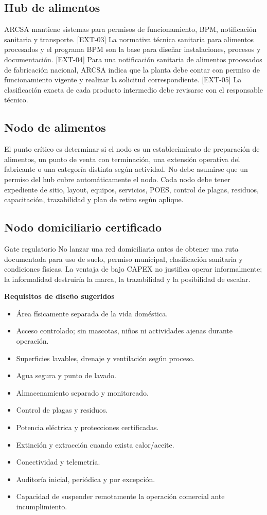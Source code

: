 \documentclass[11pt,a4paper]{article}
\newcommand{\etiqueta}[1]{\par\medskip\noindent\textbf{#1}\par\nopagebreak\smallskip}
\begin{document}
\subsection{Hub de alimentos}
ARCSA mantiene sistemas para permisos de funcionamiento, BPM, notificación sanitaria y transporte.
[EXT-03] La normativa técnica sanitaria para alimentos procesados y el programa BPM son la base para
diseñar instalaciones, procesos y documentación. [EXT-04] Para una notificación sanitaria de alimentos
procesados de fabricación nacional, ARCSA indica que la planta debe contar con permiso de funcionamiento
vigente y realizar la solicitud correspondiente. [EXT-05] La clasificación exacta de cada producto
intermedio debe revisarse con el responsable técnico.

\subsection{Nodo de alimentos}
El punto crítico es determinar si el nodo es un establecimiento de preparación de alimentos, un punto de
venta con terminación, una extensión operativa del fabricante o una categoría distinta según actividad.
No debe asumirse que un permiso del hub cubre automáticamente el nodo. Cada nodo debe tener expediente de
sitio, layout, equipos, servicios, POES, control de plagas, residuos, capacitación, trazabilidad y plan de
retiro según aplique.

\subsection{Nodo domiciliario certificado}
\begin{caja}{Gate regulatorio}
No lanzar una red domiciliaria antes de obtener una ruta documentada para uso de suelo, permiso
municipal, clasificación sanitaria y condiciones físicas. La ventaja de bajo CAPEX no justifica operar
informalmente; la informalidad destruiría la marca, la trazabilidad y la posibilidad de escalar.
\end{caja}

\etiqueta{Requisitos de diseño sugeridos}
\begin{itemize}
\item Área físicamente separada de la vida doméstica.
\item Acceso controlado; sin mascotas, niños ni actividades ajenas durante operación.
\item Superficies lavables, drenaje y ventilación según proceso.
\item Agua segura y punto de lavado.
\item Almacenamiento separado y monitoreado.
\item Control de plagas y residuos.
\item Potencia eléctrica y protecciones certificadas.
\item Extinción y extracción cuando exista calor/aceite.
\item Conectividad y telemetría.
\item Auditoría inicial, periódica y por excepción.
\item Capacidad de suspender remotamente la operación comercial ante incumplimiento.
\end{itemize}
\end{document}
